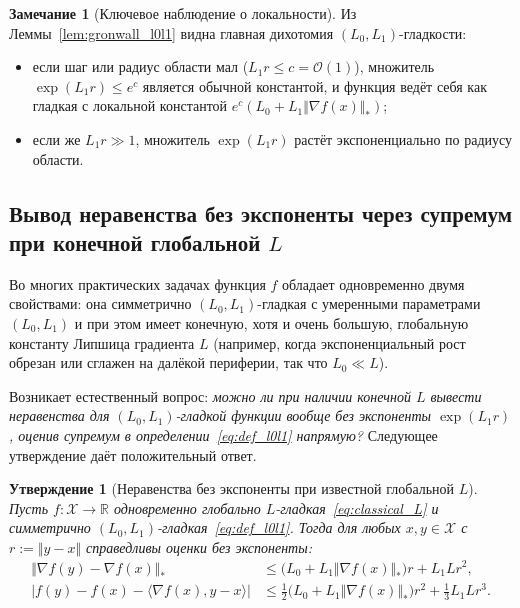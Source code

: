 \documentclass[11pt, a4paper]{article}
\newtheorem{proposition}{Утверждение}[section]
\theoremstyle{definition}
\newtheorem{remark}{Замечание}[section]
\begin{document}
\begin{remark}[Ключевое наблюдение о локальности]
Из Леммы~\ref{lem:gronwall_l0l1} видна главная дихотомия $(L_0, L_1)$-гладкости:
\begin{itemize}
    \item если шаг или радиус области мал ($L_1 r \le c = \mathcal{O}(1)$), множитель $\exp(L_1 r) \le e^c$ является обычной константой, и функция ведёт себя как гладкая с локальной константой $e^c (L_0 + L_1 \Vert \nabla f(x) \Vert_*)$;
    \item если же $L_1 r \gg 1$, множитель $\exp(L_1 r)$ растёт экспоненциально по радиусу области.
\end{itemize}
\end{remark}

\subsection{Вывод неравенства без экспоненты через супремум при конечной глобальной $L$}

Во многих практических задачах функция $f$ обладает одновременно двумя свойствами: она симметрично $(L_0, L_1)$-гладкая с умеренными параметрами $(L_0, L_1)$ и при этом имеет конечную, хотя и очень большую, глобальную константу Липшица градиента $L$ (например, когда экспоненциальный рост обрезан или сглажен на далёкой периферии, так что $L_0 \ll L$).

Возникает естественный вопрос: \emph{можно ли при наличии конечной $L$ вывести неравенства для $(L_0, L_1)$-гладкой функции вообще без экспоненты $\exp(L_1 r)$, оценив супремум в определении~\eqref{eq:def_l0l1} напрямую?} Следующее утверждение даёт положительный ответ.

\begin{proposition}[Неравенства без экспоненты при известной глобальной $L$]\label{prop:no_exp_finite_L}
Пусть $f : \mathcal{X} \to \mathbb{R}$ одновременно глобально $L$-гладкая~\eqref{eq:classical_L} и симметрично $(L_0, L_1)$-гладкая~\eqref{eq:def_l0l1}. Тогда для любых $x, y \in \mathcal{X}$ с $r := \Vert y - x \Vert$ справедливы оценки без экспоненты:
\begin{align}
\Vert \nabla f(y) - \nabla f(x) \Vert_* &\le \big(L_0 + L_1 \Vert \nabla f(x) \Vert_*\big) r + L_1 L r^2, \label{eq:grad_no_exp} \\
\big| f(y) - f(x) - \langle \nabla f(x), y - x \rangle \big| &\le \frac{1}{2}\big(L_0 + L_1 \Vert \nabla f(x) \Vert_*\big) r^2 + \frac{1}{3} L_1 L r^3. \label{eq:func_no_exp}
\end{align}
\end{proposition}
\end{document}
